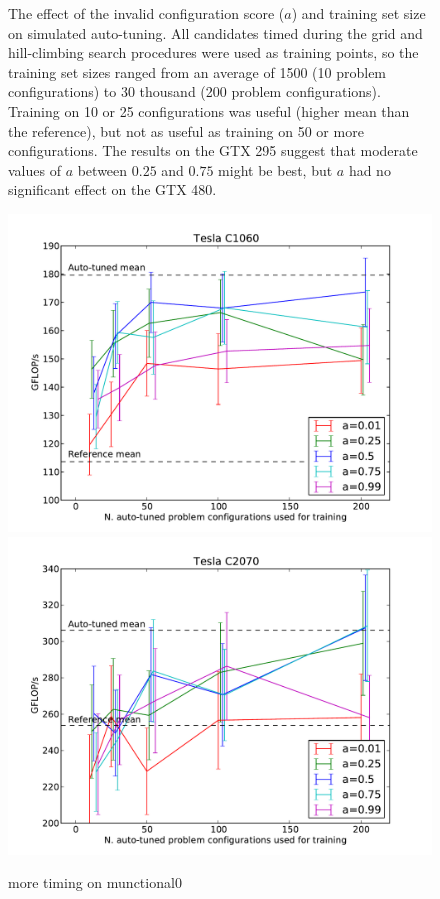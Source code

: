\documentclass{sig-alternate}
\begin{document}
\begin{figure}
\caption{The effect of the invalid configuration score ($a$) and training set
size on simulated auto-tuning.
All candidates timed during the grid and
hill-climbing search procedures were used as training points, so the training
set sizes ranged from an average of 1500 (10 problem configurations) to 30
thousand (200 problem configurations).
Training on 10 or 25 configurations was useful (higher mean than the reference),
but not as useful as training on 50 or more configurations.
The results on the GTX 295 suggest that
moderate values of $a$ between $0.25$ and $0.75$ might be
best, but $a$ had no significant effect on the GTX 480.
}
\label{fig:fig_ntrain}
\end{figure}

\begin{figure}
\centering
\includegraphics[scale=.42]{fig_ntrain_munctional0_1060.pdf}
\includegraphics[scale=.42]{fig_ntrain_munctional0_2070.pdf}
\caption{more timing on munctional0}
\label{fig:fig_ntrain}
\end{figure}
\end{document}
